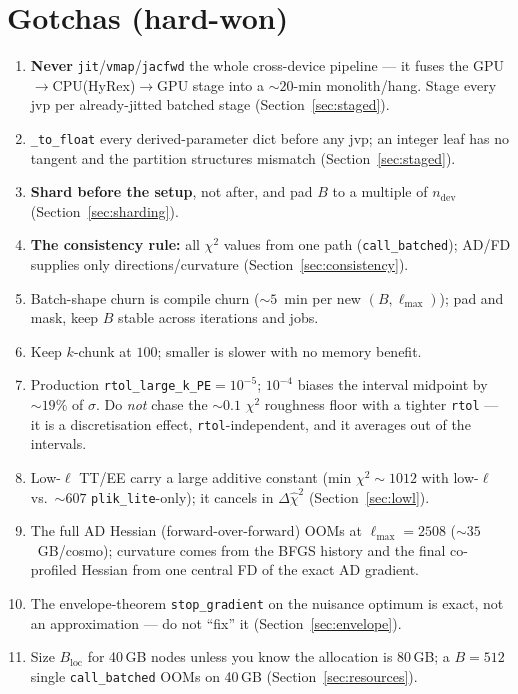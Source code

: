 \documentclass[11pt]{article}
\newcommand{\code}[1]{\texttt{\small #1}}
\newcommand{\chisq}{\chi^2}
\newcommand{\dchisq}{\Delta\hat\chi^2}
\newcommand{\Lmax}{\ell_{\max}}
\newcommand{\Bloc}{B_{\mathrm{loc}}}
\begin{document}
\section{Gotchas (hard-won)}
\label{sec:gotchas}

\begin{enumerate}[leftmargin=2em,itemsep=2pt]
\item \textbf{Never} \code{jit}/\code{vmap}/\code{jacfwd} the whole
cross-device pipeline --- it fuses the GPU$\to$CPU(HyRex)$\to$GPU stage
into a $\sim20$-min monolith/hang. Stage every jvp per already-jitted
batched stage (Section~\ref{sec:staged}).
\item \code{\_to\_float} every derived-parameter dict before any jvp;
an integer leaf has no tangent and the partition structures mismatch
(Section~\ref{sec:staged}).
\item \textbf{Shard before the setup}, not after, and pad $B$ to a
multiple of $n_{\mathrm{dev}}$ (Section~\ref{sec:sharding}).
\item \textbf{The consistency rule:} all $\chisq$ values from one path
(\code{call\_batched}); AD/FD supplies only directions/curvature
(Section~\ref{sec:consistency}).
\item Batch-shape churn is compile churn ($\sim5$~min per new
$(B,\Lmax)$); pad and mask, keep $B$ stable across iterations and jobs.
\item Keep $k$-chunk at $100$; smaller is slower with no memory benefit.
\item Production \code{rtol\_large\_k\_PE}$=10^{-5}$; $10^{-4}$ biases the
interval midpoint by $\sim19\%$ of $\sigma$. Do \emph{not} chase the
$\sim0.1$ $\chisq$ roughness floor with a tighter \code{rtol} --- it is a
discretisation effect, \code{rtol}-independent, and it averages out of the
intervals.
\item Low-$\ell$ TT/EE carry a large additive constant (min $\chisq\sim1012$
with low-$\ell$ vs.\ $\sim607$ \code{plik\_lite}-only); it cancels in
$\dchisq$ (Section~\ref{sec:lowl}).
\item The full AD Hessian (forward-over-forward) OOMs at $\Lmax=2508$
($\sim35$~GB/cosmo); curvature comes from the BFGS history and the final
co-profiled Hessian from one central FD of the exact AD gradient.
\item The envelope-theorem \code{stop\_gradient} on the nuisance optimum
is exact, not an approximation --- do not ``fix'' it
(Section~\ref{sec:envelope}).
\item Size $\Bloc$ for 40\,GB nodes unless you know the allocation is
80\,GB; a $B=512$ single \code{call\_batched} OOMs on 40\,GB
(Section~\ref{sec:resources}).
\end{enumerate}
\end{document}
